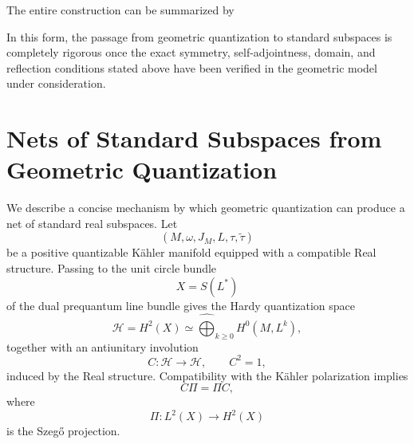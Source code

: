 \documentclass[a4paper,11pt]{article}
\theoremstyle{definition}
\newcommand{\cH}{\mathcal{H}}
\begin{document}
The entire construction can be summarized by
\begin{center}
\end{center}
In this form, the passage from geometric quantization to standard subspaces is
completely rigorous once the exact symmetry, self-adjointness, domain, and
reflection conditions stated above have been verified in the geometric model
under consideration.
\section{Nets of Standard Subspaces from Geometric Quantization}
\label{app:net_standard_subspaces_gq}

We describe a concise mechanism by which geometric quantization can produce
a net of standard real subspaces.  Let
\begin{equation}
    (M,\omega,J_M,L,\tau,\widetilde\tau)
\end{equation}
be a positive quantizable K\"ahler manifold equipped with a compatible Real
structure.  Passing to the unit circle bundle
\begin{equation}
    X=S(L^*)
\end{equation}
of the dual prequantum line bundle gives the Hardy quantization space
\begin{equation}
    \cH
    =
    H^2(X)
    \simeq
    \widehat{\bigoplus}_{k\geq0}H^0(M,L^k),
\end{equation}
together with an antiunitary involution
\begin{equation}
    C:\cH\rightarrow\cH,
    \qquad
    C^2=1,
\end{equation}
induced by the Real structure.  Compatibility with the K\"ahler
polarization implies
\begin{equation}
    C\Pi=\Pi C,
\end{equation}
where
\begin{equation}
    \Pi:L^2(X)\rightarrow H^2(X)
\end{equation}
is the Szeg\H{o} projection.
\end{document}
